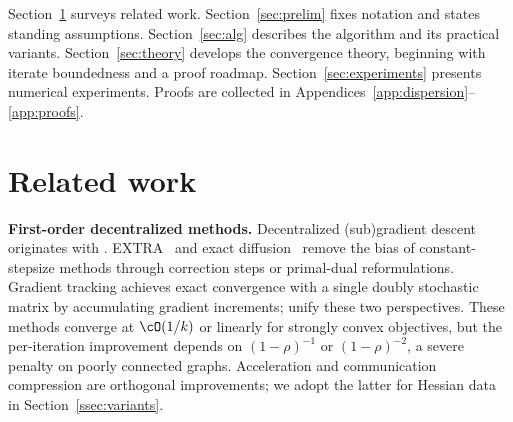 \documentclass[review,onefignum,onetabnum]{siamart171218}
\begin{document}
Section~\ref{sec:related} surveys related work.
Section~\ref{sec:prelim} fixes notation and states standing assumptions.
Section~\ref{sec:alg} describes the algorithm and its practical variants.
Section~\ref{sec:theory} develops the convergence theory, beginning
with iterate boundedness and a proof roadmap.
Section~\ref{sec:experiments} presents numerical experiments.
Proofs are collected in
Appendices~\ref{app:dispersion}--\ref{app:proofs}.

	\section{Related work}\label{sec:related}
	
	\noindent\textbf{First-order decentralized methods.}
	Decentralized (sub)gradient descent originates with
	\citet{nedic2009subgradient}.
	EXTRA~\citep{shi2015extra} and exact
	diffusion~\citep{yuan2019exactdiffusion} remove the bias of
	constant-stepsize methods through correction steps or primal-dual
	reformulations.
	Gradient tracking
	\citep{nedic2017diging,xin2019distributed,pu2021distributed}
	achieves exact convergence with a single doubly stochastic matrix
	by accumulating gradient increments;
	\citet{alghunaim2020decentralized} unify these two perspectives.
	These methods converge at $\cO(1/k)$ or linearly for strongly convex
	objectives, but the per-iteration improvement depends on
	$(1-\rho)^{-1}$ or $(1-\rho)^{-2}$, a severe penalty on poorly
	connected graphs.
	Acceleration \citep{jakovetic2014fast,li2021decentralized} and
	communication compression
	\citep{koloskova2019decentralized,beznosikov2023biased} are
	orthogonal improvements; we adopt the latter for Hessian data
	in Section~\ref{ssec:variants}.
\end{document}
